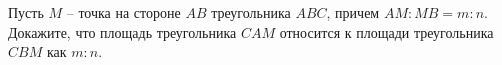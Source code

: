 \begin{ex}
	\begin{condition}
		Пусть \( M  \) – точка на стороне \( AB  \) треугольника \( ABC \), причем \( AM : MB = m : n \). Докажите, что площадь треугольника \( CAM  \) относится к площади треугольника \( CBM  \) как \( m : n \).
	\end{condition}
\end{ex}